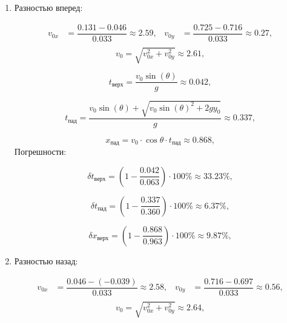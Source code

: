 \documentclass{report}
\begin{document}
\begin{enumerate}
\item Разностью вперед:

\begin{equation}
\begin{aligned}
  v_{0x} &= \dfrac{0.131 - 0.046}{0.033} \approx 2.59\text{,} \quad
  v_{0y} &= \dfrac{0.725 - 0.716}{0.033} \approx 0.27\text{,}\\
\end{aligned}
\end{equation}
    \begin{equation}
  v_0 = \sqrt{v_{0x}^2 + v_{0y}^2} \approx 2.61\text{,}
    \end{equation}

\begin{equation}
  t_{\text{верх}} = \dfrac{v_0 \sin(\theta)}{g}\approx 0.042\text{,}
\end{equation}

\begin{equation}
  t_{\text{пад}} = \dfrac{v_0 \sin(\theta)+\sqrt{v_0 \sin(\theta)^2+2 g y_0}}{g} \approx 0.337\text{,}
\end{equation}

\begin{equation}
  x_{\text{пад}} = v_0\cdot\cos{\theta}\cdot t_{\text{пад}} \approx 0.868\text{,}
\end{equation}
Погрешности:

\begin{equation}
  \delta t_{\text{верх}} = (1 - \dfrac{0.042}{0.063}) \cdot 100 \% \approx 33.23\% \text{,}
\end{equation}

\begin{equation}
  \delta t_{\text{пад}} = (1 - \dfrac{0.337}{0.360}) \cdot 100 \% \approx 6.37\% \text{,}
\end{equation}

\begin{equation}
  \delta x_{\text{верх}} = (1 - \dfrac{0.868}{0.963}) \cdot 100 \% \approx 9.87\% \text{,}
\end{equation}

\item Разностью назад:

\begin{equation}
\begin{aligned}
  v_{0x} &= \dfrac{0.046 - (-0.039)}{0.033} \approx 2.58\text{,} \quad
  v_{0y} &= \dfrac{0.716 - 0.697}{0.033} \approx 0.56\text{,}\\
\end{aligned}
\end{equation}
    \begin{equation}
  v_0 = \sqrt{v_{0x}^2 + v_{0y}^2} \approx 2.64\text{,}
    \end{equation}


\end{enumerate}
\end{document}
